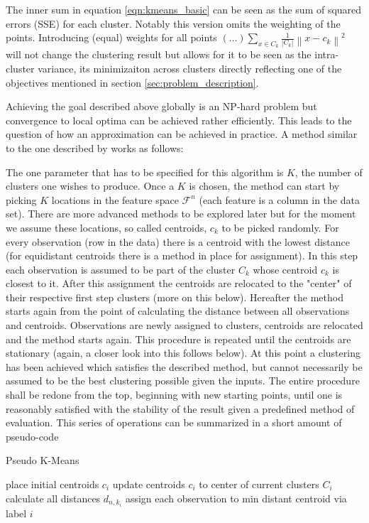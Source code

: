 The inner sum in equation \ref{eqn:kmeans_basic} can be seen as the sum of squared errors (SSE) for each cluster. Notably this version omits the weighting of the points. Introducing (equal) weights for all points $(\dots)\sum_{x \in C_{k}}^{} \frac{1}{\left | C_{k} \right |} \left \| x - c_{k} \right \|^2$ will not change the clustering result but allows for it to be seen as the intra-cluster variance, its minimizaiton across clusters directly reflecting one of the objectives mentioned in section \ref{sec:problem_description}.

Achieving the goal described above globally is an NP-hard problem but convergence to local optima can be achieved rather efficiently. This leads to the question of how an approximation can be achieved in practice. A method similar to the one described by \cite{lloyd1982least,wu2012advances} works as follows:

The one parameter that has to be specified for this algorithm is $K$, the number of clusters one wishes to produce. Once a $K$ is chosen, the method can start by picking $K$ locations in the feature space $\mathcal{F}^{n}$ (each feature is a column in the data set). There are more advanced methods to be explored later but for the moment we assume these locations, so called centroids, $c_{k}$ to be picked randomly.
For every observation (row in the data) there is a centroid with the lowest distance (for equidistant centroids there is a method in place for assignment). In this step each observation is assumed to be part of the cluster $C_{k}$ whose centroid $c_{k}$ is closest to it. After this assignment the centroids are relocated to the "center" of their respective first step clusters (more on this below). Hereafter the method starts again from the point of calculating the distance between all observations and centroids. Observations are newly assigned to clusters, centroids are relocated and the method starts again. This procedure is repeated until the centroids are stationary (again, a closer look into this follows below). At this point a clustering has been achieved which satisfies the described method, but cannot necessarily be assumed to be the best clustering possible given the inputs. The entire procedure shall be redone from the top, beginning with new starting points, until one is reasonably satisfied with the stability of the result given a predefined method of evaluation. This series of operations can be summarized in a short amount of pseudo-code
\begin{algorithm}
\caption{Pseudo K-Means}\label{euclid}
\begin{algorithmic}[1]
\State place initial centroids $c_{i}$ 
\State update centroids $c_{i}$ to center of current clusters $C_{i}$ 
\EndIf
\State calculate all distances $d_{n, k_{i}}$ 
\State assign each observation to min distant centroid via label $i$
\EndWhile
\end{algorithmic}
\end{algorithm}

